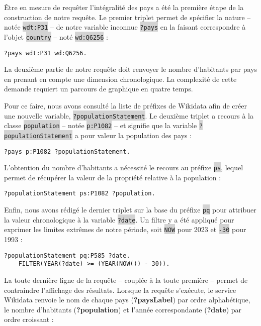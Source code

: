 \documentclass[hidelinks, 12pt]{article}
\newcommand{\code}[1]{\colorbox{LightGray}{\texttt{#1}}}
\begin{document}
Être en mesure de requêter l'intégralité des pays a été la première étape de la construction de notre requête. Le premier triplet permet de spécifier la nature -- notée \code{wdt:P31} -- de notre variable inconnue \code{?pays} en la faisant correspondre à l'objet \code{country} -- noté \code{wd:Q6256} :
		
\begin{lstlisting}[language=SPARQL]
	?pays wdt:P31 wd:Q6256.
\end{lstlisting}

La deuxième partie de notre requête doit renvoyer le nombre d'habitants par pays en prenant en compte une dimension chronologique. La complexité de cette demande requiert un parcours de graphique en quatre temps.

Pour ce faire, nous avons consulté la liste de préfixes\autocite{wikiprefixes} de Wikidata afin de créer une nouvelle variable, \code{?populationStatement}. Le deuxième triplet a recours à la classe \code{population} -- notée \code{p:P1082} -- et signifie que la variable \code{?populationStatement} a pour valeur la population des pays :

\begin{lstlisting}[language=SPARQL]
	?pays p:P1082 ?populationStatement.
\end{lstlisting}

L'obtention du nombre d'habitants a nécessité le recours au préfixe \code{ps}, lequel permet de récupérer la valeur de la propriété relative à la population :
		
\begin{lstlisting}[language=SPARQL]
	?populationStatement ps:P1082 ?population.
\end{lstlisting}

Enfin, nous avons rédigé le dernier triplet sur la base du préfixe \code{pq} pour attribuer la valeur chronologique à la variable \code{?date}. Un filtre y a été appliqué pour exprimer les limites extrêmes de notre période, soit \code{NOW} pour 2023 et \code{-30} pour 1993 :
	
\begin{lstlisting}[language=SPARQL]
	?populationStatement pq:P585 ?date.
	FILTER(YEAR(?date) >= (YEAR(NOW()) - 30)).
\end{lstlisting}

La toute dernière ligne de la requête -- couplée à la toute première -- permet de contraindre l'affichage des résultats. Lorsque la requête s'exécute, le service Wikidata renvoie le nom de chaque pays (\textbf{?paysLabel}) par ordre alphabétique, le nombre d'habitants (\textbf{?population}) et l'année correspondante (\textbf{?date}) par ordre croissant :
\end{document}
